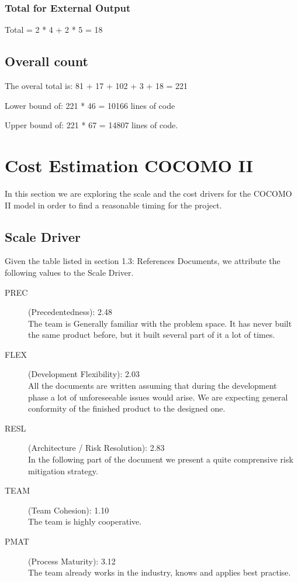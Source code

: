 \documentclass[11pt]{article} %
\begin{document}
\subsubsection{Total for External Output}
Total = 2 * 4 + 2 * 5 = 18

\subsection{Overall count}

The overal total is: \hfill
81 + 17 + 102 + 3 + 18 = 221


Lower bound of:\hfill
221 * 46 = {\Large 10166} lines of code

Upper bound of: \hfill
221 * 67 = {\Large 14807} lines of code.




\newpage
\section{Cost Estimation COCOMO II}

In this section we are exploring the scale and the cost drivers for the COCOMO II model in order to find a reasonable timing for the project.

\subsection{Scale Driver}

Given the table listed in section 1.3: References Documents, we attribute the following values to the Scale Driver.

\begin{description}
	\item[PREC] (Precedentedness):  {\large 2.48} 
\\ The team is Generally familiar with the problem space. It has never built the same product before, but it built several part of it a lot of times.
	\item[FLEX] (Development Flexibility): {\large 2.03} \\ All the documents are written assuming that during the development phase a lot of unforeseeable issues would arise. We are expecting general conformity of the finished product to the designed one.
	\item[RESL] (Architecture / Risk Resolution): {\large 2.83} \\ In the following part of the document we present a quite comprensive risk mitigation strategy. 
	\item[TEAM] (Team Cohesion): {\large 1.10} \\ The team is highly cooperative. 
	\item[PMAT] (Process Maturity): {\large 3.12} \\ The team already works in the industry, knows and applies best practise.
\end{description}
\end{document}
